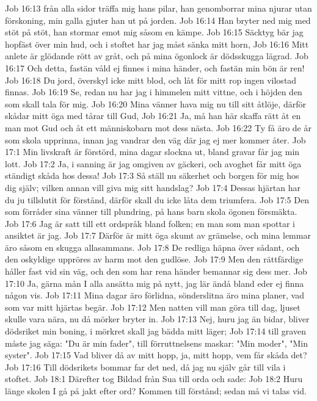 Job 16:13  från alla sidor träffa mig hans pilar, han genomborrar mina njurar utan förskoning, min galla gjuter han ut på jorden.
Job 16:14  Han bryter ned mig med stöt på stöt, han stormar emot mig såsom en kämpe.
Job 16:15  Säcktyg bär jag hopfäst över min hud, och i stoftet har jag måst sänka mitt horn,
Job 16:16  Mitt anlete är glödande rött av gråt, och på mina ögonlock är dödsskugga lägrad.
Job 16:17  Och detta, fastän våld ej finnes i mina händer, och fastän min bön är ren!
Job 16:18  Du jord, överskyl icke mitt blod, och låt för mitt rop ingen vilostad finnas.
Job 16:19  Se, redan nu har jag i himmelen mitt vittne, och i höjden den som skall tala för mig.
Job 16:20  Mina vänner hava mig nu till sitt åtlöje, därför skådar mitt öga med tårar till Gud,
Job 16:21  Ja, må han här skaffa rätt åt en man mot Gud och åt ett människobarn mot dess nästa.
Job 16:22  Ty få äro de år som skola upprinna, innan jag vandrar den väg där jag ej mer kommer åter.
Job 17:1  Min livskraft är förstörd, mina dagar slockna ut, bland gravar får jag min lott.
Job 17:2  Ja, i sanning är jag omgiven av gäckeri, och avoghet får mitt öga ständigt skåda hos dessa!
Job 17:3  Så ställ nu säkerhet och borgen för mig hos dig själv; vilken annan vill giva mig sitt handslag?
Job 17:4  Dessas hjärtan har du ju tillslutit för förstånd, därför skall du icke låta dem triumfera.
Job 17:5  Den som förråder sina vänner till plundring, på hans barn skola ögonen försmäkta.
Job 17:6  Jag är satt till ett ordspråk bland folken; en man som man spottar i ansiktet är jag.
Job 17:7  Därför är mitt öga skumt av grämelse, och mina lemmar äro såsom en skugga allasammans.
Job 17:8  De redliga häpna över sådant, och den oskyldige uppröres av harm mot den gudlöse.
Job 17:9  Men den rättfärdige håller fast vid sin väg, och den som har rena händer bemannar sig dess mer.
Job 17:10  Ja, gärna mån I alla ansätta mig på nytt, jag lär ändå bland eder ej finna någon vis.
Job 17:11  Mina dagar äro förlidna, sönderslitna äro mina planer, vad som var mitt hjärtas begär.
Job 17:12  Men natten vill man göra till dag, ljuset skulle vara nära, nu då mörker bryter in.
Job 17:13  Nej, huru jag än bidar, bliver dödsriket min boning, i mörkret skall jag bädda mitt läger;
Job 17:14  till graven måste jag säga: "Du är min fader", till förruttnelsens maskar: "Min moder", "Min syster".
Job 17:15  Vad bliver då av mitt hopp, ja, mitt hopp, vem får skåda det?
Job 17:16  Till dödsrikets bommar far det ned, då jag nu själv går till vila i stoftet.
Job 18:1  Därefter tog Bildad från Sua till orda och sade:
Job 18:2  Huru länge skolen I gå på jakt efter ord? Kommen till förstånd; sedan må vi talas vid.
